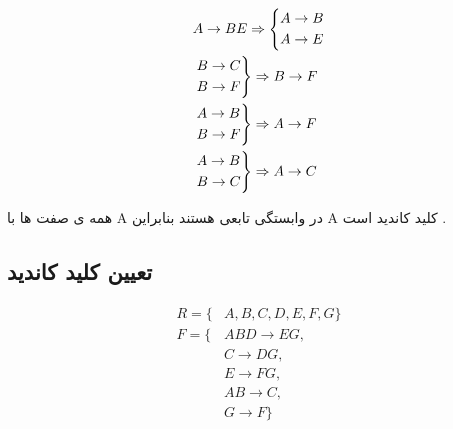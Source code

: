 \documentclass{article}
\begin{document}
\begin{align*}
&A \to BE \Rightarrow  \begin{cases*}  A \to B \\ A \to E  \end{cases*}  \\
&\begin{rcases*}B \to C \\ B \to F \end{rcases*} \Rightarrow B \to F \\
&\begin{rcases*}A \to B \\ B \to F \end{rcases*} \Rightarrow A \to F \\
&\begin{rcases*}A \to B \\ B \to C \end{rcases*} \Rightarrow A \to C \\
\end{align*}


همه ی صفت ها با A در وابستگی تابعی هستند بنابراین A کلید کاندید است .



\newpage

\subsection{تعیین کلید کاندید }

\begin{align*}
R = \{ &A , B , C , D , E , F , G \}  \\
F = \{ &ABD \to EG , \\
&C \to DG , \\
&E \to FG , \\
&AB \to C , \\
&G \to F \}
\end{align*}
\end{document}

